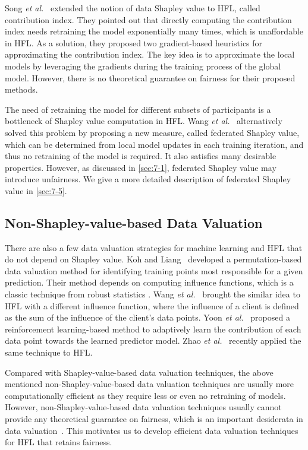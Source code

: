 Song \textit{et al.}~\cite{song2019profit} extended the notion of data Shapley value to HFL, called contribution index. They pointed out that directly computing the contribution index needs retraining the model exponentially many times, which is unaffordable in HFL. As a solution, they proposed two gradient-based heuristics for approximating the contribution index. The key idea is to approximate the local models by leveraging the gradients during the training process of the global model. However, there is no theoretical guarantee on fairness for their proposed methods. 

The need of retraining the model for different subsets of participants is a bottleneck of Shapley value computation in HFL. Wang \textit{et al.}~\cite{wang2020principled} alternatively solved this problem by proposing a new measure, called federated Shapley value, which can be determined from local model updates in each training iteration, and thus no retraining of the model is required. It also satisfies many desirable properties. However, as discussed in \autoref{sec:7-1}, federated Shapley value may introduce unfairness. We give a more detailed description of federated Shapley value in \autoref{sec:7-5}. 

\subsection{Non-Shapley-value-based Data Valuation}
There are also a few data valuation strategies for machine learning and HFL that do not depend on Shapley value. Koh and Liang~\cite{koh2017understanding} developed a permutation-based data valuation method for identifying training points most responsible for a given prediction. Their method depends on computing influence functions, which is a classic technique from robust statistics \cite{hampel1974influence}. Wang \textit{et al.}~\cite{wang2019measure} brought the similar idea to HFL with a different influence function, where the influence of a client is defined as the sum of the influence of the client's data points. Yoon \textit{et al.}~\cite{yoon2020data} proposed a reinforcement learning-based method to adaptively learn the contribution of each data point towards the learned predictor model. Zhao \textit{et al.}~\cite{zhao2021efficient} recently applied the same technique to HFL. 

Compared with Shapley-value-based data valuation techniques, the above mentioned non-Shapley-value-based data valuation techniques are usually more computationally efficient as they require less or even no retraining of models. However, non-Shapley-value-based data valuation techniques usually cannot provide any theoretical guarantee on fairness, which is an important desiderata in data valuation~\cite{ghorbani2019data, pei2020survey}. This motivates us to develop efficient data valuation techniques for HFL that retains fairness. 

